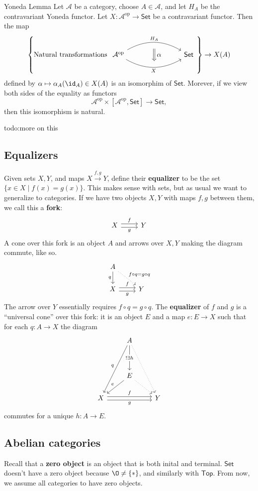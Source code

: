 \begin{namedthm}{Yoneda Lemma} 
    Let $\mathcal{A} $ be a category, choose $A \in \mathcal{A} $, and let $H_A$ be the contravariant Yoneda functor. Let $X \colon \mathcal{A} ^{\mathrm{op}} \to \mathsf{Set} $ be a contravariant functor. Then the map \[
        \left\{ \mathrm{Natural \ transformations} \ 
    \begin{tikzcd}
        \mathcal{A}^{\mathrm{op}} \arrow[rr, "H_A", bend left] \arrow[rr, "X"', bend right] & \,\,~ \Big\Downarrow\alpha & \mathsf{Set} 
\end{tikzcd}
        \right\} \to  X(A)
    \] defined by $\alpha  \mapsto \alpha _A(\id_A) \in X(A)$ is an isomorphim of $\mathsf{Set} $. Morever, if we view both sides of the equality as functors \[
    \mathcal{A} ^{\mathrm{op}}\times [ \mathcal{A} ^{\mathrm{op}}, \mathsf{Set} ]\to \mathsf{Set} ,
    \] then this isomorphism is natural.
\end{namedthm}
{\color{red}todo:more on this} 

\subsection{Equalizers}
Given sets $X,Y$, and maps $X \xrightarrow{f,g} Y$, define their \textbf{equalizer} to be the set $\{x \in X \mid f(x)=g(x)\} $. This makes sense with sets, but as usual we want to generalize to categories. If we have two objects $X,Y$ with maps $f,g$ between them, we call this a \textbf{fork}: \[
\begin{tikzcd}
X \arrow[r, "f", shift left] \arrow[r, "g"', shift right] & Y
\end{tikzcd}
\] A cone over this fork is an object $A$ and arrows over $X,Y$ making the diagram commute, like so. \[
\begin{tikzcd}
A \arrow[d, "q"'] \arrow[rd, "f\circ q=g \circ q", dotted] &   \\
X \arrow[r, "f", shift left] \arrow[r, "g"', shift right]  & Y
\end{tikzcd}
\] The arrow over $Y$ essentially requires $f \circ q = g \circ q$. The \textbf{equalizer} of $f$ and $g$ is a ``universal cone'' over this fork: it is an object $E$ and a map $e \colon E \to X$ such that for each $q \colon A \to X$ the diagram \[
\begin{tikzcd}
                                                            & A \arrow[dd, "!\exists h" description] \arrow[lddd, "q"'] \arrow[rddd, dotted] &   \\
                                                            &                                                                                &   \\
                                                            & E \arrow[ld, "e"'] \arrow[rd, dotted]                                          &   \\
X \arrow[rr, "g"', shift right] \arrow[rr, "f", shift left] &                                                                                & Y
\end{tikzcd}
\] commutes for a unique $h \colon A \to E$.

\subsection{Abelian categories}
Recall that a \textbf{zero object} is an object that is both inital and terminal. $\mathsf{Set} $ doesn't have a zero object because $\O \neq \{*\} $, and similarly with $\mathsf{Top} $. From now, we assume all categories to have zero objects.
